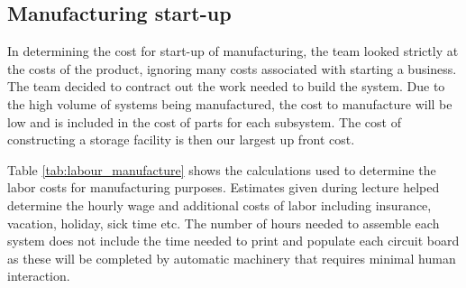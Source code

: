 \subsection{Manufacturing start-up}
In determining the cost for start-up of manufacturing, the team looked strictly at the costs of the product, ignoring many costs associated with starting a business. The team decided to contract out the work needed to build the system. Due to the high volume of systems being manufactured, the cost to manufacture will be low and is included in the cost of parts for each subsystem. The cost of constructing a storage facility is then our largest up front cost. %

Table \ref{tab:labour_manufacture} shows the calculations used to determine the labor costs for manufacturing purposes. Estimates given during lecture \cite{Nielsen_Cost_Est} helped determine the hourly wage and additional costs of labor including insurance, vacation, holiday, sick time etc. The number of hours needed to assemble each system does not include the time needed to print and populate each circuit board as these will be completed by automatic machinery that requires minimal human interaction. 

